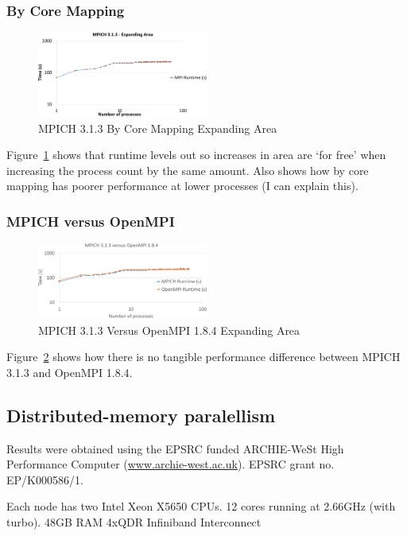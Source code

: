 \subsubsection{By Core Mapping}

\begin{figure}
    \includegraphics[page=1,width=0.5\textwidth]
    {graphs/MPICH313-by-core-mapping-expanding-area-crop.pdf}
    \caption{MPICH 3.1.3 By Core Mapping Expanding Area}
    \label{fig:mpichbycoremappingexpandingarea}
\end{figure}

Figure~\ref{fig:mpichbycoremappingexpandingarea} shows that runtime levels out
so increases in area are `for free' when increasing the process count by the
same amount. Also shows how by core mapping has poorer performance at lower
processes (I can explain this).

\subsubsection{MPICH versus OpenMPI}

\begin{figure}
    \includegraphics[page=1,width=0.5\textwidth]
    {graphs/MPICH313-versus-OpenMPI184-crop.pdf}
    \caption{MPICH 3.1.3 Versus OpenMPI 1.8.4 Expanding Area}
    \label{fig:mpichversusopenmpiexpandingarea}
\end{figure}

Figure~\ref{fig:mpichversusopenmpiexpandingarea} shows how there is no tangible
performance difference between MPICH 3.1.3 and OpenMPI 1.8.4.

\subsection{Distributed-memory paralellism}

Results were obtained using the EPSRC funded ARCHIE-WeSt High Performance
Computer (\url{www.archie-west.ac.uk}). EPSRC grant no. EP/K000586/1.

Each node has two Intel Xeon X5650 CPUs. 12 cores running at 2.66GHz (with
turbo). 48GB RAM 4xQDR Infiniband Interconnect
